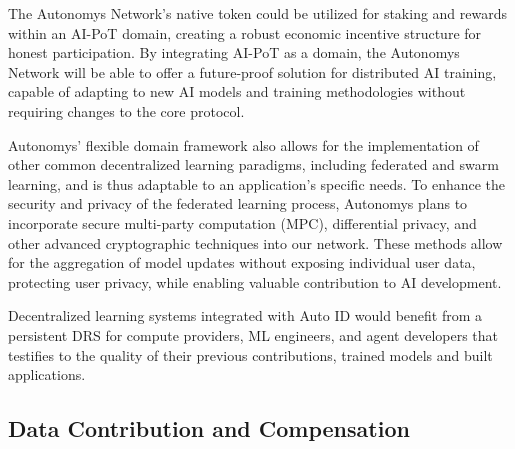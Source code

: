 \documentclass[conference]{IEEEtran}
\begin{document}
The Autonomys Network's native token could be utilized for staking and rewards within an AI-PoT domain, creating a robust economic incentive structure for honest participation. By integrating AI-PoT as a domain, the Autonomys Network will be able to offer a future-proof solution for distributed AI training, capable of adapting to new AI models and training methodologies without requiring changes to the core protocol.

Autonomys' flexible domain framework also allows for the implementation of other common decentralized learning paradigms, including federated and swarm learning, and is thus adaptable to an application's specific needs. To enhance the security and privacy of the federated learning process, Autonomys plans to incorporate secure multi-party computation (MPC), differential privacy, and other advanced cryptographic techniques\cite{truex2019} into our network. These methods allow for the aggregation of model updates without exposing individual user data, protecting user privacy, while enabling valuable contribution to AI development.

Decentralized learning systems integrated with Auto ID would benefit from a persistent DRS for compute providers, ML engineers, and agent developers that testifies to the quality of their previous contributions, trained models and built applications.

\subsection{Data Contribution and Compensation}
\label{sec:datacomp}
\end{document}

